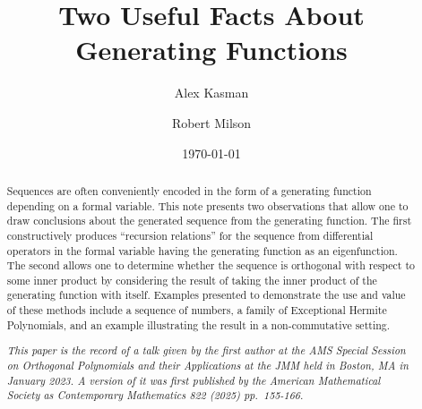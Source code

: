 \documentclass{amsart}
\theoremstyle{definition}
\theoremstyle{remark}
\numberwithin{equation}{section}
\begin{document}
\title{Two Useful Facts About Generating Functions}


\author{Alex Kasman}
\address{Department of Mathematics / College of Charleston /
  Charleston SC 29401}

\author{Robert Milson}
\address{Department of Mathematics and Statistics, Dalhousie
  University, Halifax, NS B3H~3J5}


\date{\today}

\begin{abstract}
Sequences are often conveniently encoded in the form of a generating
function depending on a formal variable.  
This note presents two observations that allow one to draw conclusions
about the generated sequence from the generating function.  The first
constructively produces ``recursion relations'' for the sequence from
differential operators in the formal variable having the generating function as an
eigenfunction.  The second allows one to determine whether the
sequence is orthogonal with respect to some inner product by
considering the result of taking the inner product of the generating
function with itself. Examples
presented to demonstrate the use and value of these methods
include a sequence of numbers, 
a family of Exceptional Hermite Polynomials, and an example
illustrating the result in a non-commutative setting.


\medskip


\raggedright
\noindent\textit{This paper is the record of a talk given by the first author at the AMS  Special Session on Orthogonal Polynomials and their Applications at the JMM held in Boston, MA in January 2023.  A version of it was first published by the American Mathematical Society as Contemporary Mathematics 822 (2025) pp.~155-166.}


\end{abstract}

\maketitle
\end{document}
